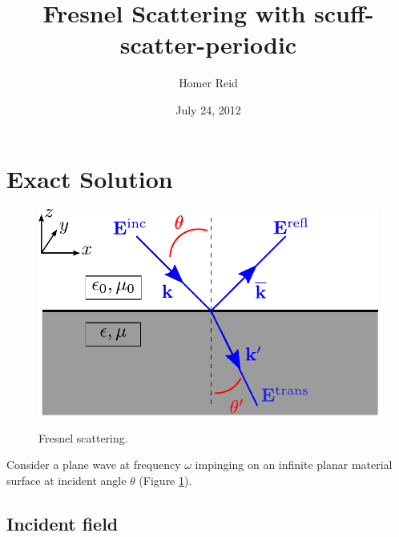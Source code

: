 \documentclass[letterpaper]{article}
\title {Fresnel Scattering with {\sc scuff-scatter-periodic}}
\author {Homer Reid}
\date {July 24, 2012}
\begin{document}
\pagestyle{myheadings}
\maketitle

\tableofcontents

\newpage
\section{Exact Solution}
\begin{figure}
\begin{center}
\includegraphics{FresnelCartoon.pdf}
\label{FresnelCartoonFigure}
\caption{Fresnel scattering.}
\end{center}
\end{figure}

Consider a plane wave at frequency $\omega$ impinging on an infinite
planar material surface at incident angle $\theta$ 
(Figure \ref{FresnelCartoonFigure}).

\subsection*{Incident field}
\end{document}
